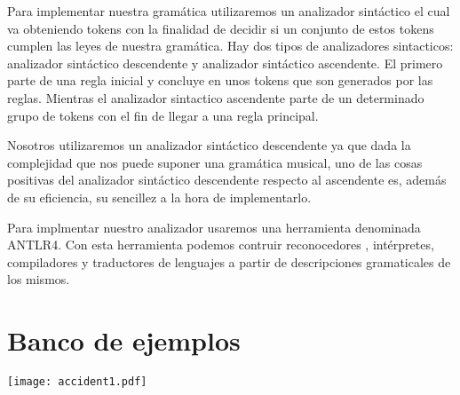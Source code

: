 \documentclass{article}
\begin{document}
Para implementar nuestra gramática utilizaremos un analizador sintáctico el cual va obteniendo tokens con la finalidad de
decidir si un conjunto de estos tokens cumplen las leyes de nuestra gramática. Hay dos tipos de analizadores sintacticos:
analizador sintáctico descendente y analizador sintáctico ascendente. El primero parte de una regla inicial y concluye en unos
tokens que son generados por las reglas. Mientras el analizador sintactico ascendente parte de un determinado grupo de tokens con
el fin de llegar a una regla principal.

Nosotros utilizaremos un analizador sintáctico descendente ya que dada la complejidad que nos puede suponer una gramática musical,
uno de las cosas positivas del analizador sintáctico descendente respecto al ascendente es, además de su eficiencia, su sencillez a
la hora de implementarlo.

Para implmentar nuestro analizador usaremos una herramienta denominada ANTLR4. Con esta herramienta podemos contruir reconocedores
, intérpretes, compiladores y traductores de lenguajes a partir de descripciones gramaticales de los mismos.

\section{Banco de ejemplos}
\texttt{[image: accident1.pdf]}
\end{document}
